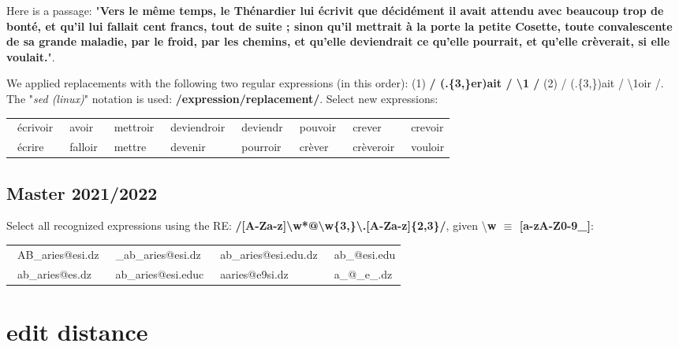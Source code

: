 \documentclass[11pt, a4paper]{article}
\begin{document}
Here is a passage: "\textbf{Vers le même temps, le Thénardier lui écrivit que décidément il avait attendu avec beaucoup trop de bonté, et qu'il lui fallait cent francs, tout de suite ; sinon qu'il mettrait à la porte la petite Cosette, toute convalescente de sa grande maladie, par le froid, par les chemins, et qu'elle deviendrait ce qu'elle pourrait, et qu'elle crèverait, si elle voulait.}". 

We applied replacements with the following two regular expressions (in this order): (1) \textbf{/ (.\{3,\}er)ait / \textbackslash1 /} (2) / (.\{3,\})ait / \textbackslash1oir /.  
The "\textit{sed (linux)}" notation is used: \textbf{/expression/replacement/}. Select new expressions: 
\begin{center}
	\begin{tabular}{|llllllll|}
		\hline
		\Square\ écrivoir & 
		\Square\ avoir & 
		\Square\ mettroir & 
		\Square\ deviendroir &
		\Square\ deviendr & 
		\Square\ pouvoir & 
		\Square\ crever & 
		\Square\ crevoir \\
		
		\Square\ écrire & 
		\Square\ falloir & 
		\Square\ mettre & 
		\Square\ devenir &
		\Square\ pourroir & 
		\Square\ crèver & 
		\Square\ crèveroir & 
		\Square\ vouloir \\
		\hline
	\end{tabular}
\end{center}

\subsection{Master 2021/2022}

Select all recognized expressions using the RE: \textbf{/[A-Za-z]\textbackslash w*@\textbackslash w\{3,\}\textbackslash.[A-Za-z]\{2,3\}/}, given \textbackslash \textbf{w $\equiv$ [a-zA-Z0-9\_]}:
\begin{center}
	\begin{tabular}{|llll|}
		\hline
		\Square\ AB\_aries@esi.dz & 
		\Square\ \_ab\_aries@esi.dz & 
		\Square\ ab\_aries@esi.edu.dz  & 
		\Square\ ab\_@esi.edu \\
		\Square\ ab\_aries@es.dz & 
		\Square\ ab\_aries@esi.educ &
		\Square\ aaries@e9si.dz & 
		\Square\ a\_@\_e\_.dz \\
		\hline
	\end{tabular}
\end{center}




\section{edit distance}
\end{document}
